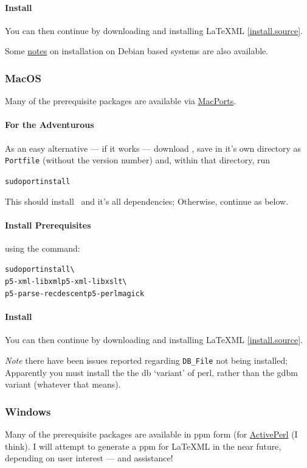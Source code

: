 \documentclass{article}
\begin{document}
\paragraph{Install}
You can then continue by downloading and installing LaTeXML \ref{install.source}.

Some \href{http://rhaptos.org/devblog/reedstrm/latexml}{notes} on installation on Debian
based systems are also available.

\subsubsection{MacOS}\label{install.macos}
Many of the prerequisite packages are available via
\href{http://www.macports.org}{MacPorts}.
\paragraph{For the Adventurous}  As an easy alternative --- if it works ---
download \CurrentMacOS, save in it's own directory as \texttt{Portfile}
(without the version number) and, within that directory, run
\begin{alltt}
  sudo port install
\end{alltt}
This should install \LaTeXML\ and it's all dependencies;
Otherwise, continue as below.
\paragraph{Install Prerequisites} using the command:
\begin{alltt}
  sudo port install    \textbackslash\\
      p5-xml-libxml p5-xml-libxslt  \textbackslash\\
      p5-parse-recdescent p5-perlmagick
\end{alltt}
\paragraph{Install}
You can then continue by downloading and installing LaTeXML \ref{install.source}.

\emph{Note} there have been issues reported regarding \verb|DB_File|
not being installed;  Apparently you must install the 
the db `variant' of perl, rather than the gdbm variant
(whatever that means).

\subsubsection{Windows}\label{install.windows}
Many of the prerequisite packages are available in
ppm form (for \href{http://activestate.com/}{ActivePerl} (I think).
I will attempt to generate a ppm for LaTeXML in the near
future, depending on user interest --- and assistance!
\end{document}
